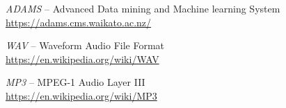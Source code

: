 
\begin{thebibliography}{999}

		\textit{ADAMS} -- Advanced Data mining and Machine learning System \\
		\url{https://adams.cms.waikato.ac.nz/}{}
		
		\textit{WAV} -- Waveform Audio File Format \\
		\url{https://en.wikipedia.org/wiki/WAV}{}
		
		\textit{MP3} -- MPEG-1 Audio Layer III \\
		\url{https://en.wikipedia.org/wiki/MP3}{}

\end{thebibliography}
